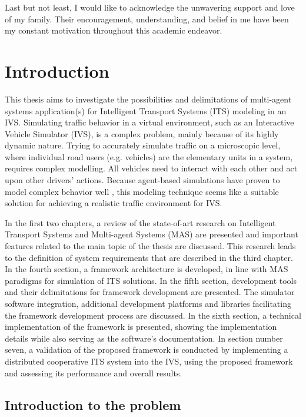 \documentclass[titlepage, 12pt]{article}
\begin{document}
Last but not least, I would like to acknowledge the unwavering support and love of my family.
Their encouragement, understanding, and belief in me have been my constant motivation
throughout this academic endeavor. \clearpage

\tableofcontents
\listoftables
\listoffigures
\newpage

\section{Introduction}

This thesis aims to investigate the possibilities and delimitations of multi-agent systems
application(s) for Intelligent Transport Systems (ITS) modeling in an IVS. Simulating traffic
behavior in a virtual environment, such as an Interactive Vehicle Simulator (IVS), is a complex
problem, mainly because of its highly dynamic nature. Trying to accurately simulate traffic on
a microscopic level, where individual road users (e.g. vehicles) are the elementary units in a
system, requires complex modelling. All vehicles need to interact with each other and act upon
other drivers' actions. Because agent-based simulations have proven to model complex behavior
well \cite{Shoham}, this modeling technique seems like a suitable solution for achieving a realistic traffic
environment for IVS. 

In the first two chapters, a review of the state-of-art research on Intelligent Transport
Systems and Multi-agent Systems (MAS) are presented and important features related
to the main topic of the thesis are discussed. This research leads to the definition of system requirements
that are described in the third chapter. In the fourth section, a framework architecture 
is developed, in line with MAS paradigms for simulation of ITS solutions. In the fifth
section, development tools and their delimitations for framework development are presented.
The simulator software integration, additional development platforms and
libraries facilitating the framework development process are discussed. In the sixth section,
a technical implementation of the framework is presented, showing the implementation details
while also serving as the software's documentation. In section number seven, a validation of
the proposed framework is conducted by implementing a distributed cooperative ITS system into the
IVS, using the proposed framework and assessing its performance and overall results.

\subsection{Introduction to the problem}
\end{document}
